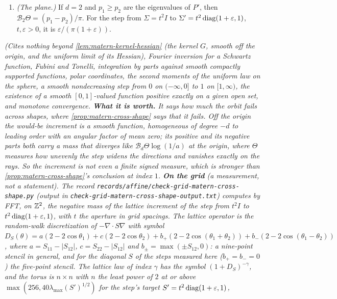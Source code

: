 \begin{proposition}
\begin{enumerate}
then there is no finite signed measure $\rho$ with $\mu_{\Sigma'} = \mu_\Sigma * \rho$.
\item \emph{(The plane.)} If $d = 2$ and $p_1 \ge p_2$ are the eigenvalues of $P'$, then
$\mathcal{B}_2\Theta = (p_1 - p_2)/\pi$. For the step from $\Sigma = t^2I$ to
$\Sigma' = t^2\operatorname{diag}(1+\varepsilon, 1)$, $t, \varepsilon > 0$, it is $\varepsilon/(\pi(1+\varepsilon))$.
\end{enumerate}
\statusT\quad\emph{(Cites nothing beyond \ref{lem:matern-kernel-hessian} (the
kernel $G$, smooth off the origin, and the uniform limit of its Hessian), Fourier inversion for a Schwartz
function, Fubini and Tonelli, integration by parts against smooth compactly supported functions,
polar coordinates, the second moments of the uniform law on the sphere, a smooth nondecreasing step
from $0$ on $(-\infty,0]$ to $1$ on $[1,\infty)$, the existence of a smooth $[0,1]$-valued function
positive exactly on a given open set, and monotone convergence. \textbf{What it is worth.} It says how much the \Matern{} orbit
fails across shapes, where \ref{prop:matern-cross-shape} says that it fails. Off the origin the
would-be increment is a smooth function, homogeneous of degree $-d$ to leading order with an angular
factor of mean zero; its positive and its negative parts both carry a mass that diverges like
$\mathcal{B}_d\Theta\log(1/a)$ at the origin, where $\Theta$ measures how unevenly the step widens
the directions and vanishes exactly on the rays. So the increment is not even a finite signed
measure, which is stronger than \ref{prop:matern-cross-shape}'s conclusion at index $1$.
\textbf{On the grid} (a measurement, not a statement). The record
\texttt{records/affine/check-grid-matern-cross-shape.py} (output in
\texttt{check-grid-matern-cross-shape-output.txt}) computes by FFT, on $\mathbb{Z}^2$, the negative mass of
the lattice increment of the step from $t^2I$ to $t^2\operatorname{diag}(1+\varepsilon,1)$, with $t$ the aperture in
grid spacings. The lattice operator is the random-walk discretization of $-\nabla\cdot S\nabla$ with symbol
$D_S(\theta) = a(2 - 2\cos\theta_1) + c(2 - 2\cos\theta_2) + b_+(2 - 2\cos(\theta_1+\theta_2))
+ b_-(2 - 2\cos(\theta_1-\theta_2))$, where $a = S_{11} - |S_{12}|$, $c = S_{22} - |S_{12}|$ and
$b_\pm = \max(\pm S_{12}, 0)$: a nine-point stencil in general, and for the diagonal $S$ of the steps
measured here ($b_+ = b_- = 0$) the five-point stencil. The lattice \Matern{} law of index $\gamma$ has
the symbol $(1 + D_S)^{-\gamma}$, and the torus is $n \times n$ with $n$ the least power of $2$ at or
above $\max(256, 40\lambda_{\max}(S')^{1/2})$ for the step's target $S' = t^2\operatorname{diag}(1+\varepsilon,1)$,
}
\end{proposition}
